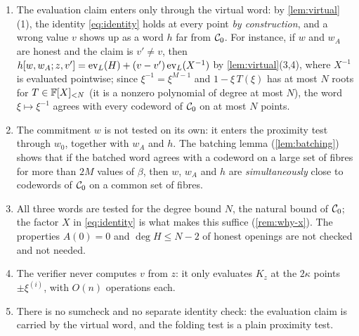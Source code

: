\begin{remark}[Design]\label{rem:design}
\begin{enumerate}
  \item The evaluation claim enters only through the virtual word: by \cref{lem:virtual}(1), the identity \eqref{eq:identity} holds at every point \emph{by construction}, and a wrong value $v$ shows up as a word $h$ far from $\mathcal{C}_0$. For instance, if $w$ and $w_A$ are honest and the claim is $v' \ne v$, then $h[w,w_A;z,v'] = \mathrm{ev}_L(H) + (v - v')\,\mathrm{ev}_L(X^{-1})$ by \cref{lem:virtual}(3,4), where $X^{-1}$ is evaluated pointwise; since $\xi^{-1} = \xi^{M-1}$ and $1 - \xi\,T(\xi)$ has at most $N$ roots for $T \in \mathbb{F}[X]_{<N}$ (it is a nonzero polynomial of degree at most $N$), the word $\xi \mapsto \xi^{-1}$ agrees with every codeword of $\mathcal{C}_0$ on at most $N$ points.
  \item The commitment $w$ is not tested on its own: it enters the proximity test through $w_0$, together with $w_A$ and $h$. The batching lemma (\cref{lem:batching}) shows that if the batched word agrees with a codeword on a large set of fibres for more than $2M$ values of $\beta$, then $w$, $w_A$ and $h$ are \emph{simultaneously} close to codewords of $\mathcal{C}_0$ on a common set of fibres.
  \item All three words are tested for the degree bound $N$, the natural bound of $\mathcal{C}_0$; the factor $X$ in \eqref{eq:identity} is what makes this suffice (\cref{rem:why-x}). The properties $A(0) = 0$ and $\deg H \le N-2$ of honest openings are not checked and not needed.
  \item The verifier never computes $v$ from $z$: it only evaluates $K_z$ at the $2\kappa$ points $\pm\xi^{(i)}$, with $O(n)$ operations each.
  \item There is no sumcheck and no separate identity check: the evaluation claim is carried by the virtual word, and the folding test is a plain proximity test.
\end{enumerate}
\end{remark}

